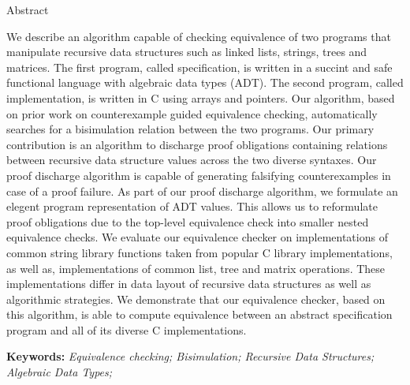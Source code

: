 \begin{center}

\LARGE{Abstract}
\end{center}
We describe an algorithm capable of checking
equivalence of two programs that manipulate recursive
data structures such as linked lists, strings, trees
and matrices. The first program, called specification,
is written in a succint and safe functional language
with algebraic data types (ADT).
The second program, called implementation,
is written in C using arrays and pointers.
Our algorithm, based on prior work on
counterexample guided equivalence checking,
automatically searches for a bisimulation
relation between the two programs. Our
primary contribution is an algorithm to
discharge proof obligations containing relations
between recursive data structure values across
the two diverse syntaxes.
Our proof discharge algorithm is capable
of generating falsifying counterexamples in case of
a proof failure.
As part of our proof discharge algorithm,
we formulate an elegent program representation of
ADT values.
This allows us to reformulate proof obligations
due to the top-level equivalence check
into smaller nested equivalence checks.
We evaluate our equivalence checker on
implementations of common string library
functions taken from popular C library implementations,
as well as,
implementations of common list, tree and matrix
operations.
These implementations differ in data layout
of recursive data structures as well as
algorithmic strategies.
We demonstrate that our equivalence checker,
based on this algorithm,
is able to compute equivalence between an abstract
specification program and all of its diverse
C implementations.


\textbf{Keywords:} \textit{Equivalence checking; Bisimulation; Recursive Data Structures; Algebraic Data Types;}

\setlength{\parindent}{1.0em}
